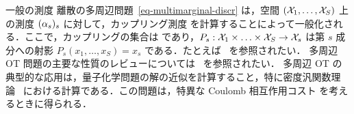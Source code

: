\begin{rem2}{一般の測度}
離散の多周辺問題~\eqref{eq-multimarginal-discr} は，空間 $(\mathcal{X}_1,\ldots,\mathcal{X}_S)$ 上の測度 $(\alpha_s)_s$ に対して，カップリング測度
を計算することによって一般化される．ここで，カップリングの集合は
であり，$P_s : \mathcal{X}_1 \times \ldots \times \mathcal{X}_S \rightarrow \mathcal{X}_s$ は第 $s$ 成分への射影 $P_s(x_1,\ldots,x_S)=x_s$ である．たとえば~\citep{GangboSciech} を参照されたい．
%
多周辺 OT 問題の主要な性質のレビューについては~\citep{PassMultiReview,PassMultiMarginalStructure} を参照されたい．
%
多周辺 OT の典型的な応用は，量子化学問題の解の近似を計算すること，特に密度汎関数理論~\citep{CotarDFT,GorSeiVig,BuDePGor} における計算である．この問題は，特異な Coulomb 相互作用コスト
を考えるときに得られる．
\end{rem2}



